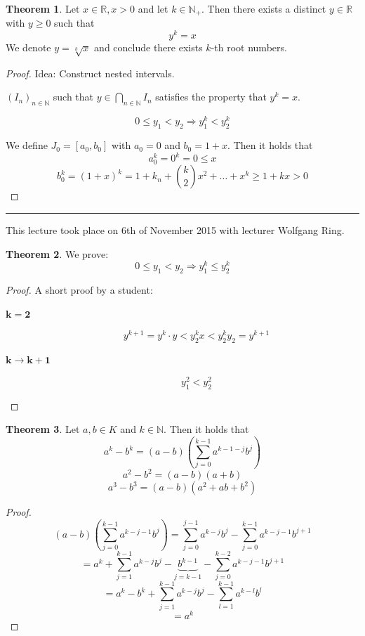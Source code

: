 \documentclass[a4paper,landscape,twocolumn]{article}
\theoremstyle{definition}
\newtheorem{theorem}{Theorem}
\newcommand\meta[3]{\hrule{} This #1 took place on #2 with lecturer #3.\par}
\begin{document}
\begin{theorem}
  Let $x \in \mathbb R, x > 0$ and let $k \in \mathbb N_+$.
  Then there exists a distinct $y \in \mathbb R$ with $y \geq 0$
  such that
  \[ y^k = x \]
  We denote $y = \sqrt[k]{x}$ and conclude there exists $k$-th root numbers.
\end{theorem}

\begin{proof}
  Idea: Construct nested intervals.

  $(I_n)_{n \in \mathbb N}$ such that $y \in \bigcap_{n \in \mathbb N} I_n$
  satisfies the property that $y^k = x$.

  \[ 0 \leq y_1 < y_2 \Rightarrow y_1^k < y_2^k \]

  We define $J_0 = [a_0, b_0]$ with $a_0 = 0$ and $b_0 = 1 + x$.
  Then it holds that
  \[ a_0^k = 0^k = 0 \leq x \]
  \[ b_0^k = (1 + x)^k = 1 + k_n + \binom{k}{2} x^2 + \dots + x^k \geq 1 + kx > 0 \]
\end{proof}

\meta{lecture}{6th of November 2015}{Wolfgang Ring}

\begin{theorem}
  We prove:
  \[ 0 \leq y_1 < y_2 \Rightarrow y_1^k \leq y_2^k \]
\end{theorem}
\begin{proof}
  A short proof by a student:
  \begin{description}
    \item[$\mathbf{k = 2}$]
      \[ y^{k+1} = y^k \cdot y < y_2^k x < y_2^k y_2 = y^{k+1} \]
    \item[$\mathbf{k \rightarrow k + 1}$]
      \[ y_1^2 < y_2^2 \]
  \end{description}
\end{proof}

\begin{theorem}
  Let $a, b \in K$ and $k \in \mathbb N$.
  Then it holds that
  \[ a^k - b^k = (a - b)\left(\sum_{j=0}^{k-1} a^{k-1-j} b^j\right) \]
  \[ a^2 - b^2 = (a - b)(a + b) \]
  \[ a^3 - b^3 = (a - b)(a^2 + ab + b^2) \]
\end{theorem}

\begin{proof}
  \[
    (a - b)\left(\sum_{j=0}^{k-1} a^{k-j-1} b^j\right)
    = \sum_{j=0}^{j-1} a^{k-j} b^j - \sum_{j=0}^{k-1} a^{k-j-1} b^{j+1}
  \] \[
    = a^k + \sum_{j=1}^{k-1} a^{k-j} b^j - \underbrace{b^{k-1}}_{j=k-1} - \sum_{j=0}^{k-2} a^{k-j-1} b^{j+1}
  \] \[
    = a^k - b^k + \sum_{j=1}^{k-1} a^{k-j} b^j - \sum_{l=1}^{k-1} a^{k-l} b^l
  \] \[
    = a^k
  \]
\end{proof}
\end{document}
